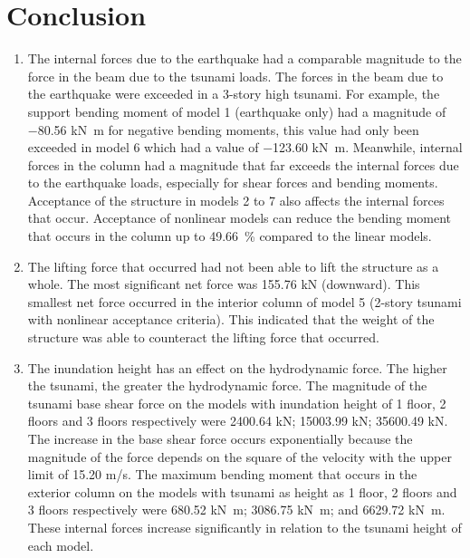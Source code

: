 \documentclass{cup-pan}
\begin{document}
\section{Conclusion}
\label{sec:conclusion}
\begin{enumerate}
\item{The internal forces due to the earthquake had a comparable magnitude to the force in the beam due to the tsunami loads. The forces in the beam due to the earthquake were exceeded in a 3-story high tsunami. For example, the support bending moment of model 1 (earthquake only) had a magnitude of \num{-80.56} \si{kN.m} for negative bending moments, this value had only been exceeded in model 6 which had a value of \num{-123.60} \si{kN.m}. Meanwhile, internal forces in the column had a magnitude that far exceeds the internal forces due to the earthquake loads, especially for shear forces and bending moments. Acceptance of the structure in models 2 to 7 also affects the internal forces that occur. Acceptance of nonlinear models can reduce the bending moment that occurs in the column up to \SI{49.66}{\percent} compared to the linear models.}

\item{The lifting force that occurred had not been able to lift the structure as a whole. The most significant net force was \num{155.76} \si{kN} (downward). This smallest net force occurred in the interior column of model 5 (2-story tsunami with nonlinear acceptance criteria). This indicated that the weight of the structure was able to counteract the lifting force that occurred.}

\item{The inundation height has an effect on the hydrodynamic force. The higher the tsunami, the greater the hydrodynamic force. The magnitude of the tsunami base shear force on the models with inundation height of 1 floor, 2 floors and 3 floors respectively were \num{2400.64} \si{kN}; \num{15003.99} \si{kN}; \num{35600.49} \si{kN}. The increase in the base shear force occurs exponentially because the magnitude of the force depends on the square of the velocity with the upper limit of \num{15.20} \si{m/s}. The maximum bending moment that occurs in the exterior column on the models with tsunami as height as 1 floor, 2 floors and 3 floors respectively were \num{680.52} \si{kN.m}; \num{3086.75} \si{kN.m}; and \num{6629.72} \si{kN.m}. These internal forces increase significantly in relation to the tsunami height of each model.
}

\end{enumerate}
\end{document}
